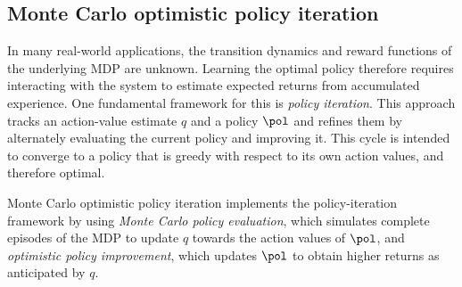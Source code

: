 \subsection{Monte Carlo optimistic policy iteration}

In many real-world applications, the transition dynamics and reward functions of the underlying MDP are unknown. Learning the optimal policy therefore requires interacting with the system to estimate expected returns from accumulated experience.
One fundamental framework for this is \textit{policy iteration}.
This approach tracks an action-value estimate $q$ and a policy $\pol$ and refines them by alternately evaluating the current policy and improving it.
This cycle is intended to converge to a policy that is greedy with respect to its own action values, and therefore optimal.

Monte Carlo optimistic policy iteration implements the policy-iteration framework by using 
\textit{Monte Carlo policy evaluation}, which simulates complete episodes of the MDP to update $q$ towards the action values of $\pol$,
and \textit{optimistic policy improvement}, which updates $\pol$ to obtain higher returns as anticipated by $q$.

